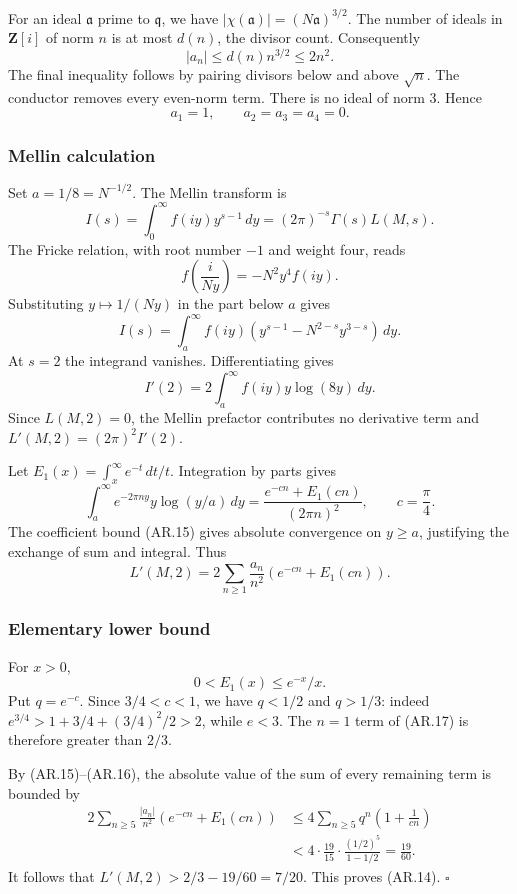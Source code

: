 \documentclass[11pt,a4paper]{article}
\begin{document}
For an ideal \(\mathfrak a\) prime to \(\mathfrak q\), we have
\(|\chi(\mathfrak a)|=(N\mathfrak a)^{3/2}\). The number of ideals in
\(\mathbf Z[i]\) of norm \(n\) is at most \(d(n)\), the divisor count.
Consequently \[
|a_n|\le d(n)n^{3/2}\le2n^2.
\tag{AR.15}
\] The final inequality follows by pairing divisors below and above
\(\sqrt n\). The conductor removes every even-norm term. There is no
ideal of norm \(3\). Hence \[
a_1=1,\qquad a_2=a_3=a_4=0.
\tag{AR.16}
\]

\subsubsection{Mellin calculation}\label{mellin-calculation}

Set \(a=1/8=N^{-1/2}\). The Mellin transform is \[
I(s)=\int_0^\infty f(iy)y^{s-1}\,dy
     =(2\pi)^{-s}\Gamma(s)L(M,s).
\] The Fricke relation, with root number \(-1\) and weight four, reads
\[
f\!\left(\frac{i}{Ny}\right)=-N^2y^4 f(iy).
\] Substituting \(y\mapsto1/(Ny)\) in the part below \(a\) gives \[
I(s)=\int_a^\infty f(iy)
 \left(y^{s-1}-N^{2-s}y^{3-s}\right)\,dy.
\] At \(s=2\) the integrand vanishes. Differentiating gives \[
I'(2)=2\int_a^\infty f(iy)y\log(8y)\,dy.
\] Since \(L(M,2)=0\), the Mellin prefactor contributes no derivative
term and \(L'(M,2)=(2\pi)^2I'(2)\).

Let \(E_1(x)=\int_x^\infty e^{-t}\,dt/t\). Integration by parts gives \[
\int_a^\infty e^{-2\pi ny}y\log(y/a)\,dy
 =\frac{e^{-cn}+E_1(cn)}{(2\pi n)^2},
\qquad c=\frac\pi4.
\] The coefficient bound (AR.15) gives absolute convergence on
\(y\ge a\), justifying the exchange of sum and integral. Thus \[
L'(M,2)
 =2\sum_{n\ge1}\frac{a_n}{n^2}
       \left(e^{-cn}+E_1(cn)\right).
\tag{AR.17}
\]

\subsubsection{Elementary lower bound}\label{elementary-lower-bound}

For \(x>0\), \[
0<E_1(x)\le e^{-x}/x.
\] Put \(q=e^{-c}\). Since \(3/4<c<1\), we have \(q<1/2\) and \(q>1/3\):
indeed \(e^{3/4}>1+3/4+(3/4)^2/2>2\), while \(e<3\). The \(n=1\) term of
(AR.17) is therefore greater than \(2/3\).

By (AR.15)--(AR.16), the absolute value of the sum of every remaining
term is bounded by \[
\begin{aligned}
2\sum_{n\ge5}\frac{|a_n|}{n^2}
       \left(e^{-cn}+E_1(cn)\right)
&\le4\sum_{n\ge5}q^n\left(1+\frac1{cn}\right)\\
&<4\cdot\frac{19}{15}\cdot
       \frac{(1/2)^5}{1-1/2}
 =\frac{19}{60}.
\end{aligned}
\] It follows that \(L'(M,2)>2/3-19/60=7/20\). This proves (AR.14).
\(\square\)
\end{document}
